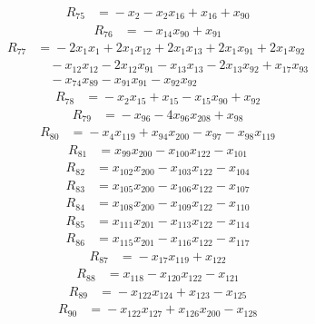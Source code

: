 \begin{align*}
R_{75}&={}-x_{2} -x_{2}x_{16} +x_{16} +x_{90}
\end{align*}
\begin{align*}
R_{76}&={}-x_{14}x_{90} +x_{91}
\end{align*}
\begin{align*}
R_{77}&={}-2x_{1}x_{1} +2x_{1}x_{12} +2x_{1}x_{13} +2x_{1}x_{91} +2x_{1}x_{92}\\
&\quad{}-x_{12}x_{12} -2x_{12}x_{91} -x_{13}x_{13} -2x_{13}x_{92} +x_{17}x_{93}\\
&\quad{}-x_{74}x_{89} -x_{91}x_{91} -x_{92}x_{92}
\end{align*}
\begin{align*}
R_{78}&={}-x_{2}x_{15} +x_{15} -x_{15}x_{90} +x_{92}
\end{align*}
\begin{align*}
R_{79}&={}-x_{96} -4x_{96}x_{208} +x_{98}
\end{align*}
\begin{align*}
R_{80}&={}-x_{4}x_{119} +x_{94}x_{200} -x_{97} -x_{98}x_{119}
\end{align*}
\begin{align*}
R_{81}&={}x_{99}x_{200} -x_{100}x_{122} -x_{101}
\end{align*}
\begin{align*}
R_{82}&={}x_{102}x_{200} -x_{103}x_{122} -x_{104}
\end{align*}
\begin{align*}
R_{83}&={}x_{105}x_{200} -x_{106}x_{122} -x_{107}
\end{align*}
\begin{align*}
R_{84}&={}x_{108}x_{200} -x_{109}x_{122} -x_{110}
\end{align*}
\begin{align*}
R_{85}&={}x_{111}x_{201} -x_{113}x_{122} -x_{114}
\end{align*}
\begin{align*}
R_{86}&={}x_{115}x_{201} -x_{116}x_{122} -x_{117}
\end{align*}
\begin{align*}
R_{87}&={}-x_{17}x_{119} +x_{122}
\end{align*}
\begin{align*}
R_{88}&={}x_{118} -x_{120}x_{122} -x_{121}
\end{align*}
\begin{align*}
R_{89}&={}-x_{122}x_{124} +x_{123} -x_{125}
\end{align*}
\begin{align*}
R_{90}&={}-x_{122}x_{127} +x_{126}x_{200} -x_{128}
\end{align*}
